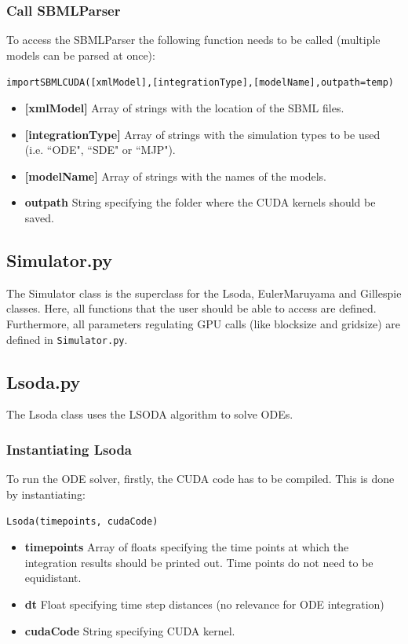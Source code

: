 \documentclass [11pt, a4paper, openany, twoside=off] {article}
\begin{document}
\subsubsection{Call SBMLParser}
To access the SBMLParser the following function needs to be called (multiple models can be parsed at once):
\begin{center}
\texttt{importSBMLCUDA([xmlModel],[integrationType],[modelName],outpath=temp)}
\end{center}
\begin{itemize}
	\item \textbf{{[}xmlModel{]}} Array of strings with the location of the SBML files.
	\item \textbf{{[}integrationType{]}} Array of strings with the simulation types to be used (i.e. ``ODE", ``SDE" or ``MJP").
	\item \textbf{{[}modelName{]}} Array of strings with the names of the models.
	\item \textbf{outpath} String specifying the folder where the CUDA kernels should be saved.
\end{itemize}


\subsection{Simulator.py}
The Simulator class is the superclass for the Lsoda, EulerMaruyama and Gillespie classes. Here, all functions that the user should be able to access are defined. Furthermore, all parameters regulating GPU calls (like blocksize and gridsize) are defined in \verb$Simulator.py$. %

\subsection{Lsoda.py}
The Lsoda class uses the LSODA algorithm to solve ODEs. 

\subsubsection{Instantiating Lsoda}
To run the ODE solver, firstly, the CUDA code has to be compiled. This is done by instantiating:
\begin{center}
\texttt{Lsoda(timepoints, cudaCode)}
\end{center}
\begin{itemize}
	\item \textbf{timepoints} Array of floats specifying the time points at which the integration results should be printed out. Time points do not need to be equidistant.
	\item \textbf{dt} Float specifying time step distances (no relevance for ODE integration)
	\item \textbf{cudaCode} String specifying CUDA kernel.
\end{itemize}
\end{document}
